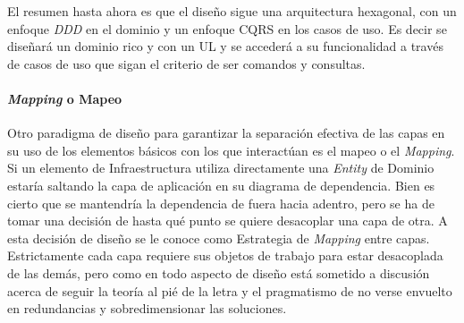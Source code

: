 El resumen hasta ahora es que el diseño sigue una arquitectura hexagonal, con un enfoque \textit{DDD} en el dominio y un enfoque CQRS en los casos de uso.
Es decir se diseñará un dominio rico y con un UL y se accederá a su funcionalidad a través de casos de uso que sigan el criterio de ser comandos y consultas.

\paragraph{\textit{Mapping} o Mapeo}

Otro paradigma de diseño para garantizar la separación efectiva de las capas en su uso de los elementos básicos con los que interactúan es el mapeo o el \textit{Mapping}.
Si un elemento de Infraestructura utiliza directamente una \textit{Entity} de Dominio estaría saltando la capa de aplicación en su diagrama de dependencia.
Bien es cierto que se mantendría la dependencia de fuera hacia adentro, pero se ha de tomar una decisión de hasta qué punto se quiere desacoplar una capa de otra.
A esta decisión de diseño se le conoce como Estrategia de \textit{Mapping} entre capas.
Estrictamente cada capa requiere sus objetos de trabajo para estar desacoplada de las demás, pero como en todo aspecto de diseño está sometido a discusión acerca de seguir la teoría al pié de la letra y el pragmatismo de no verse envuelto en redundancias y sobredimensionar las soluciones.

%
%

